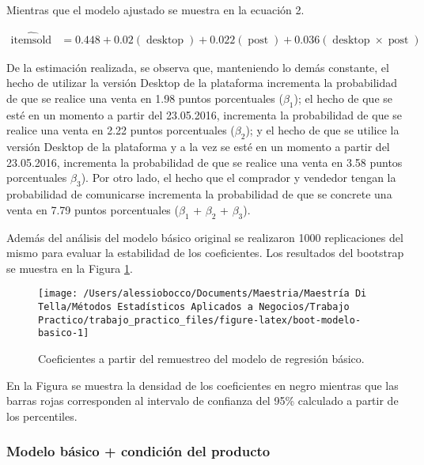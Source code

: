 \documentclass[
  12pt]{article}
\begin{document}
Mientras que el modelo ajustado se muestra en la ecuación 2.

\begin{equation}
\begin{aligned}
\operatorname{\widehat{itemsold}} &= 0.448 + 0.02(\operatorname{desktop}) + 0.022(\operatorname{post}) + 0.036(\operatorname{desktop} \times \operatorname{post})
\end{aligned}
\end{equation}

De la estimación realizada, se observa que, manteniendo lo demás constante, el hecho de utilizar la versión Desktop de la plataforma incrementa la probabilidad de que se realice una venta en 1.98 puntos porcentuales (\(\beta_1\)); el hecho de que se esté en un momento a partir del 23.05.2016, incrementa la probabilidad de que se realice una venta en 2.22 puntos porcentuales (\(\beta_2\)); y el hecho de que se utilice la versión Desktop de la plataforma y a la vez se esté en un momento a partir del 23.05.2016, incrementa la probabilidad de que se realice una venta en 3.58 puntos porcentuales \(\beta_3\)).
Por otro lado, el hecho que el comprador y vendedor tengan la probabilidad de comunicarse incrementa la probabilidad de que se concrete una venta en 7.79 puntos porcentuales (\(\beta_1\) + \(\beta_2\) + \(\beta_3\)).

Además del análisis del modelo básico original se realizaron 1000 replicaciones del mismo para evaluar la estabilidad de los coeficientes. Los resultados del bootstrap se muestra en la Figura \ref{fig:boot-modelo-basico}.

\begin{figure}

{\centering \texttt{[image: /Users/alessiobocco/Documents/Maestria/Maestría Di Tella/Métodos Estadísticos Aplicados a Negocios/Trabajo Practico/trabajo\_practico\_files/figure-latex/boot-modelo-basico-1]} 

}

\caption{Coeficientes a partir del remuestreo del modelo de regresión básico.}\label{fig:boot-modelo-basico}
\end{figure}

En la Figura se muestra la densidad de los coeficientes en negro mientras que las barras rojas corresponden al intervalo de confianza del 95\% calculado a partir de los percentiles.

\hypertarget{modelo-buxe1sico-condiciuxf3n-del-producto}{%
\subsubsection{Modelo básico + condición del producto}\label{modelo-buxe1sico-condiciuxf3n-del-producto}}
\end{document}
